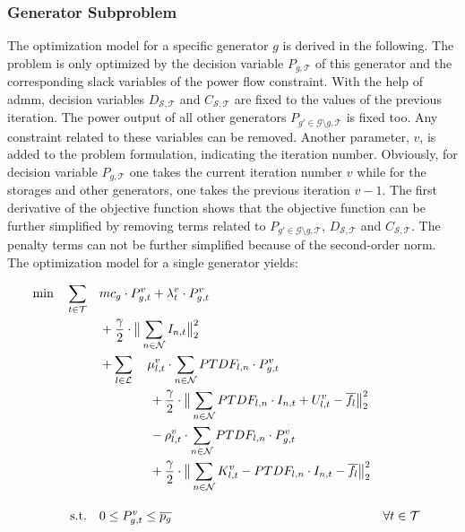 \subsubsection*{Generator Subproblem}

The optimization model for a specific generator $g$ is derived in the following. The problem is only optimized by the decision variable $P_{g,\mathcal{T}}$ of this generator and the corresponding slack variables of the power flow constraint. With the help of \gls{admm}, decision variables $D_{\mathcal{S},\mathcal{T}}$ and $C_{\mathcal{S},\mathcal{T}}$ are fixed to the values of the previous iteration. The power output of all other generators $P_{g' \in \mathcal{G}\setminus g,\mathcal{T}}$ is fixed too. Any constraint related to these variables can be removed. Another parameter, $v$, is added to the problem formulation, indicating the iteration number. Obviously, for decision variable $P_{g,\mathcal{T}}$ one takes the current iteration number $v$ while for the storages and other generators, one takes the previous iteration $v-1$. The first derivative of the objective function shows that the objective function can be further simplified by removing terms related to $P_{g' \in \mathcal{G}\setminus g,\mathcal{T}}$, $D_{\mathcal{S},\mathcal{T}}$ and $C_{\mathcal{S},\mathcal{T}}$. The penalty terms can not be further simplified because of the second-order norm. The optimization model for a single generator yields:

\begin{subequations}
	\begin{align}
		 \min \quad \sum_{t\in\mathcal{T}} \quad & mc_g \cdot P_{g,t}^v + \lambda_t^v \cdot P_{g,t}^v \label{eq:sub:gen}\\
		 & + \frac{\gamma}{2} \cdot \big\| \sum_{n \in \mathcal{N}} I_{n,t} \big\|^2_2 \nonumber \\
		 & + \sum_{l \in \mathcal{L}} \quad \mu_{l,t}^v \cdot \sum_{n \in \mathcal{N}} PTDF_{l,n} \cdot P_{g,t}^v \nonumber \\
		 & \qquad \qquad + \frac{\gamma}{2} \cdot \big\| \sum_{n \in \mathcal{N}} PTDF_{l,n} \cdot I_{n,t} + U_{l,t}^v - \overline{f_l} \big\|^2_2 \nonumber \\
		 & \qquad \qquad - \rho_{l,t}^v \cdot \sum_{n \in \mathcal{N}} PTDF_{l,n} \cdot P_{g,t}^v \nonumber \\
		 & \qquad \qquad + \frac{\gamma}{2} \cdot \big\| \sum_{n \in \mathcal{N}} K_{l,t}^v - PTDF_{l,n} \cdot I_{n,t} - \overline{f_l} \big\|^2_2 \nonumber \\[10pt]
		 \text{s.t.} \quad & 0 \leq P_{g,t}^v \leq \overline{p_g} && \forall t \in \mathcal{T}
	\end{align}
\end{subequations}

